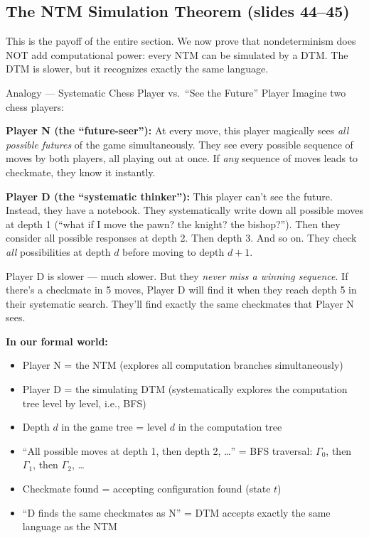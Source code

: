 \subsection{The NTM Simulation Theorem (slides 44--45)}
\label{subsec:ntm-simulation}

This is the payoff of the entire section. We now prove that nondeterminism does
NOT add computational power: every NTM can be simulated by a DTM. The DTM is
slower, but it recognizes exactly the same language.

\begin{notebox}{Analogy --- Systematic Chess Player vs.\ ``See the Future'' Player}
Imagine two chess players:

\textbf{Player N (the ``future-seer''):} At every move, this player magically
sees \emph{all possible futures} of the game simultaneously. They see every
possible sequence of moves by both players, all playing out at once. If
\emph{any} sequence of moves leads to checkmate, they know it instantly.

\textbf{Player D (the ``systematic thinker''):} This player can't see the
future. Instead, they have a notebook. They systematically write down all
possible moves at depth 1 (``what if I move the pawn? the knight? the
bishop?''). Then they consider all possible responses at depth 2. Then depth 3.
And so on. They check \emph{all} possibilities at depth $d$ before moving to
depth $d+1$.

Player D is slower --- much slower. But they \emph{never miss a winning
sequence}. If there's a checkmate in 5 moves, Player D will find it when they
reach depth 5 in their systematic search. They'll find exactly the same
checkmates that Player N sees.

\textbf{In our formal world:}
\begin{itemize}[nosep]
\item Player N = the NTM (explores all computation branches simultaneously)
\item Player D = the simulating DTM (systematically explores the computation
  tree level by level, i.e., BFS)
\item Depth $d$ in the game tree = level $d$ in the computation tree
\item ``All possible moves at depth 1, then depth 2, \ldots'' = BFS traversal:
  $\Gamma_0$, then $\Gamma_1$, then $\Gamma_2$, \ldots
\item Checkmate found = accepting configuration found (state $t$)
\item ``D finds the same checkmates as N'' = DTM accepts exactly the same
  language as the NTM
\end{itemize}
\end{notebox}

